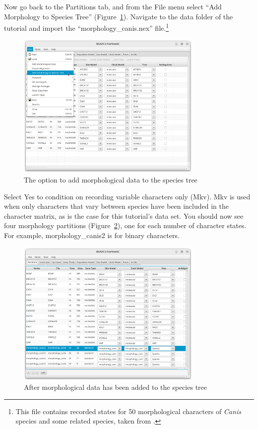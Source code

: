 \documentclass[12pt]{article}
\begin{document}
Now go back to the Partitions tab, and from the File menu select
``Add Morphology to Species Tree'' (Figure~\ref{fig:addMorphology}).
Navigate to the data folder of the tutorial and import the
``morphology\_canis.nex'' file.\footnote{This file contains recorded states for 50
morphological characters of \textit{Canis} species and some related species,
taken from \cite{Slater2015}.}

\begin{figure}[htb!]
\centering
\includegraphics[width=0.8\textwidth]{figures/addMorphology.png}
\caption
{The option to add morphological data to the species tree}
\label{fig:addMorphology}
\end{figure}

\clearpage

Select Yes to condition on recording variable characters only (Mkv). Mkv is
used when only characters that vary between species have been included in the
character matrix, as is the case for this tutorial's data set. You
should now see four morphology partitions
(Figure~\ref{fig:morphologyPartitions}), one for each number of character
states. For example, morphology\_canis2 is for binary characters.

\begin{figure}[htb!]
\centering
\includegraphics[width=0.8\textwidth]{figures/morphologyPartitions.png}
\caption
{After morphological data has been added to the species tree}
\label{fig:morphologyPartitions}
\end{figure}
\end{document}
